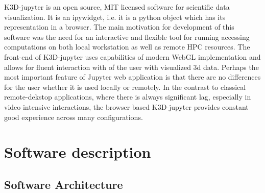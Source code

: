 \documentclass[preprint,12pt, a4paper]{elsarticle}
\begin{document}
K3D-jupyter is an open source, MIT licensed software for scientific
data visualization. It is an ipywidget, i.e. it is a python object
which has its representation in a browser. The main motivation for
development of this software was the need for an interactive and
flexible tool for running accessing computations on both local
workstation as well as remote HPC resources. The front-end of
K3D-jupyter uses capabilities of modern WebGL implementation and
allows for fluent interaction with of the user with visualized 3d
data. Perhaps the most important feature of Jupyter web application is
that there are no differences for the user whether it is used locally
or remotely. In the contrast to classical remote-dekstop applications,
where there is always significant lag, especially in video intensive
interactions, the browser based K3D-jupyter provides constant good
experience across many configurations.







\section{Software description}
\label{}



\cite{10.1145/3093338.3104159}
\cite{10.1093/bioinformatics/btx789}


\subsection{Software Architecture}
\label{}

\end{document}
